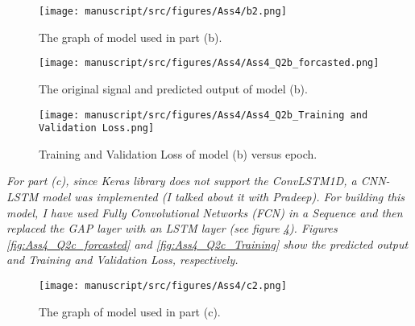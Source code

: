 \begin{figure}[H]
    \centering
    \begin{minipage}[b]{0.6\textwidth}
        \texttt{[image: manuscript/src/figures/Ass4/b2.png]}
    \end{minipage}
    \caption{The graph of model used in part (b).}
    \label{fig:modelb}
\end{figure}

\begin{figure}[H]
    \centering
    \begin{minipage}[b]{1\textwidth}
        \texttt{[image: manuscript/src/figures/Ass4/Ass4\_Q2b\_forcasted.png]}
    \end{minipage}
    \caption{The original signal and predicted output of model (b).}
    \label{fig:Ass4_Q2b_forcasted}
\end{figure}

\begin{figure}[H]
    \centering
    \begin{minipage}[b]{1\textwidth}
        \texttt{[image: manuscript/src/figures/Ass4/Ass4\_Q2b\_Training and Validation Loss.png]}
    \end{minipage}
    \caption{Training and Validation Loss of model (b) versus epoch.}
    \label{fig:Ass4_Q2b_Training}
\end{figure}















\textit{For part (c), since Keras library does not support the ConvLSTM1D, a CNN-LSTM model was implemented (I talked about it with Pradeep). For building this model, I have used Fully Convolutional Networks (FCN) in a Sequence and then replaced the GAP layer with an LSTM layer (see figure \ref{fig:modelc}). Figures \ref{fig:Ass4_Q2c_forcasted} and \ref{fig:Ass4_Q2c_Training} show the predicted output and Training and Validation Loss, respectively.}

\begin{figure}[H]
    \centering
    \begin{minipage}[b]{0.6\textwidth}
        \texttt{[image: manuscript/src/figures/Ass4/c2.png]}
    \end{minipage}
    \caption{The graph of model used in part (c).}
    \label{fig:modelc}
\end{figure}





